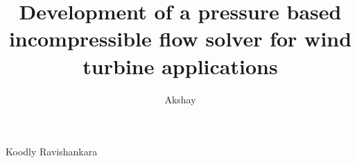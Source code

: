 \documentclass[print]{dissertation}
\begin{document}
{\color{black}

\title[ ]{Development of a pressure based incompressible flow solver for wind turbine applications}

\author{Akshay}{Koodly Ravishankara}

\frontmatter



\begin{center}
\dedication{\textit{Dedicated to my grandmothers N. Shantalakshmi and H.S. Narasamma.}{}}
\end{center}
\tableofcontents



%
\mainmatter

\thumbtrue








%
%



\thumbfalse



}
\end{document}
